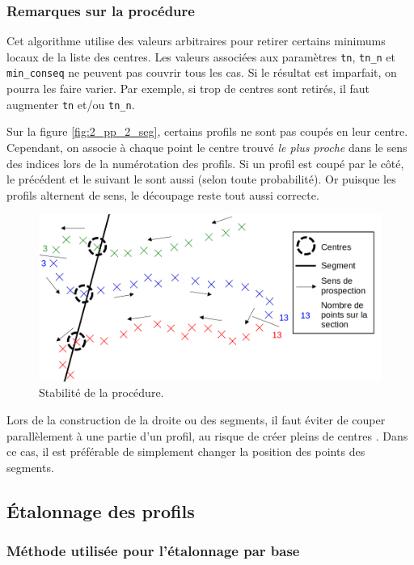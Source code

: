 \documentclass[12pt]{article}
\begin{document}
    \subsubsection{Remarques sur la procédure}

    Cet algorithme utilise des valeurs arbitraires pour retirer certains minimums locaux de la liste des centres. Les valeurs associées aux paramètres \texttt{tn}, \texttt{tn\_n} et \texttt{min\_conseq} ne peuvent pas couvrir tous les cas. Si le résultat est imparfait, on pourra les faire varier. Par exemple, si trop de centres sont retirés, il faut augmenter \texttt{tn} et/ou \texttt{tn\_n}.

    Sur la figure \ref{fig:2_pp_2_seg}, certains profils ne sont pas coupés en leur centre. Cependant, on associe à chaque point le centre trouvé \textit{le plus proche} dans le sens des indices lors de la numérotation des profils. Si un profil est coupé par le côté, le précédent et le suivant le sont aussi (selon toute probabilité). Or puisque les profils alternent de sens, le découpage reste tout aussi correcte.

    \begin{figure}[ht!]
        \centering
        \includegraphics[width=\textwidth]{Images/PseudoProf_sch.png}  
        \caption{Stabilité de la procédure.}
    \end{figure}

    Lors de la construction de la droite ou des segments, il faut éviter de couper parallèlement à une partie d'un profil, au risque de créer pleins de centres . Dans ce cas, il est préférable de simplement changer la position des points des segments.
    
\newpage  
\subsection{Étalonnage des profils}\label{2-etal}
\subsubsection{Méthode utilisée pour l'étalonnage par base}
\end{document}

